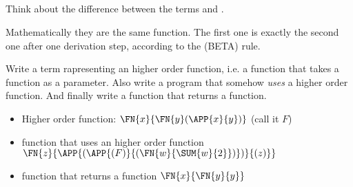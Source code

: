 \subsection{}

Think about the difference between the terms  and
.

Mathematically they are the same function. The first one is exactly
the second one after one derivation step, according to the (BETA)
rule.

Write a term rapresenting an higher order function, i.e. a function
that takes a function as a parameter. Also write a program that
somehow \textit{uses} a higher order function. And finally write a
function that returns a function.

\begin{itemize}
\item Higher order function: \(\FN{x}{\FN{y} (\APP{x}{y})}\) (call it
  \(F\))
\item function that uses an higher order function
  \(\FN{z}{\APP{(\APP{(F)}{(\FN{w}{\SUM{w}{2}})})}{(z)}}\)
\item function that returns a function \(\FN{x}{\FN{y}{y}}\)
\end{itemize}
